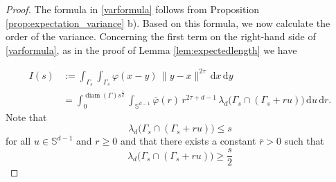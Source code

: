 \documentclass{article}
\theoremstyle{definition}
\numberwithin{equation}{section}
\theoremstyle{remark}
\begin{document}
\begin{proof}
    The formula in \eqref{varformula} follows from Proposition \ref{prop:expectation_variance} b). %
    Based on this formula, we now calculate the order of the variance. Concerning the first term on the right-hand side of \eqref{varformula}, as in the proof of Lemma \ref{lem:expectedlength} we have
    
\begin{align*}
I(s) 
  &:= \int_{\Gamma_s} \int_{\Gamma_s} 
       \varphi(x-y)\,\|y-x\|^{2\tau}\, \mathrm{d}x\, \mathrm{d}y \\[0.5em]
  &= \int_{0}^{\operatorname{diam}(\Gamma)s^{\frac{1}{d}}}\int_{\mathbb{S}^{d-1}} 
       \bar{\varphi}(r)\,r^{2\tau+d-1}\,
       \lambda_d\!\big(\Gamma_s\cap (\Gamma_s+ru)\big)\,
        \mathrm{d}u\, \mathrm{d}r.
\end{align*}
Note that
$$
\lambda_d\!\big(\Gamma_s\cap (\Gamma_s+ru)\big) \leq s
$$
for all $u\in \mathbb{S}^{d-1}$ and $r\geq 0$ and that there exists a constant $\overline{r}>0$ such that
$$
\lambda_d\!\big(\Gamma_s\cap (\Gamma_s+ru)\big) \geq \frac{s}{2}
$$
\end{proof}
\end{document}
